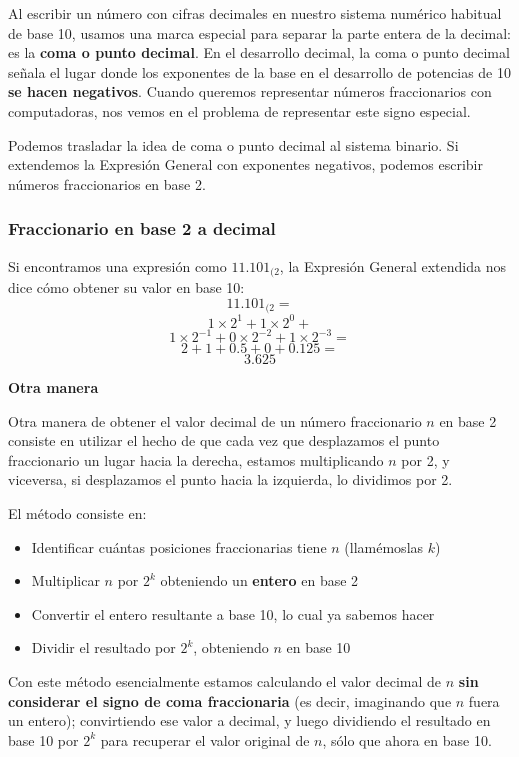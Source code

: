 \documentclass[spanish,A4,]{article}
\begin{document}
Al escribir un número con cifras decimales en nuestro sistema numérico
habitual de base 10, usamos una marca especial para separar la parte
entera de la decimal: es la \textbf{coma o punto decimal}. En el
desarrollo decimal, la coma o punto decimal señala el lugar donde los
exponentes de la base en el desarrollo de potencias de 10 \textbf{se
hacen negativos}. Cuando queremos representar números fraccionarios con
computadoras, nos vemos en el problema de representar este signo
especial.

Podemos trasladar la idea de coma o punto decimal al sistema binario. Si
extendemos la Expresión General con exponentes negativos, podemos
escribir números fraccionarios en base 2.

\subsubsection{Fraccionario en base 2 a
decimal}\label{fraccionario-en-base-2-a-decimal}

Si encontramos una expresión como $11.101_{(2}$, la Expresión General
extendida nos dice cómo obtener su valor en base 10: \[11.101_{(2}  = \]
\[1 \times 2^1 + 1 \times 2^0 +\]
\[1 \times 2^{-1} + 0 \times 2^{-2} + 1 \times 2^{-3} =\]
\[2 + 1 + 0.5 + 0 + 0.125 = \] \[3.625\]

\textbf{Otra manera}

Otra manera de obtener el valor decimal de un número fraccionario $n$ en
base 2 consiste en utilizar el hecho de que cada vez que desplazamos el
punto fraccionario un lugar hacia la derecha, estamos multiplicando $n$
por 2, y viceversa, si desplazamos el punto hacia la izquierda, lo
dividimos por 2.

El método consiste en:

\begin{itemize}
\itemsep1pt\parskip0pt
\item
  Identificar cuántas posiciones fraccionarias tiene $n$ (llamémoslas
  $k$)
\item
  Multiplicar $n$ por $2^k$ obteniendo un \textbf{entero} en base 2
\item
  Convertir el entero resultante a base 10, lo cual ya sabemos hacer
\item
  Dividir el resultado por $2^k$, obteniendo $n$ en base 10
\end{itemize}

Con este método esencialmente estamos calculando el valor decimal de $n$
\textbf{sin considerar el signo de coma fraccionaria} (es decir,
imaginando que $n$ fuera un entero); convirtiendo ese valor a decimal, y
luego dividiendo el resultado en base 10 por $2^k$ para recuperar el
valor original de $n$, sólo que ahora en base 10.
\end{document}
